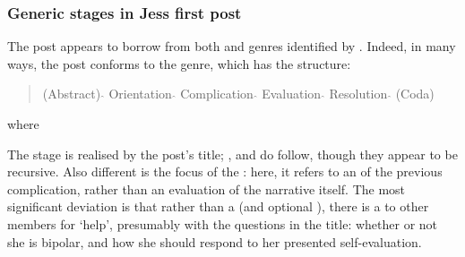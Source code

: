 \subsubsection{Generic stages in Jess first post}

The \gls{post} appears to borrow from both  and  genres identified by \textcite{labov_narrative_1997}. Indeed, in many ways, the \gls{post} conforms to the  genre, which has the structure:

\begin{quote}
(Abstract) $\hat{}$ Orientation $\hat{}$ Complication $\hat{}$ Evaluation $\hat{}$ Resolution $\hat{}$ (Coda)
\end{quote}

\noindent where

\begin{itemize}
\end{itemize}
%
The  stage is realised by the \gls{post}'s title; ,  and  do follow, though they appear to be recursive. Also different is the focus of the : here, it refers to an  of the previous complication, rather than an evaluation of the narrative itself. The most significant deviation is that rather than a  (and optional ), there is a  to other members for `help', presumably with the questions  in the title: whether or not she is bipolar, and how she should respond to her presented self\hyp{}evaluation.

